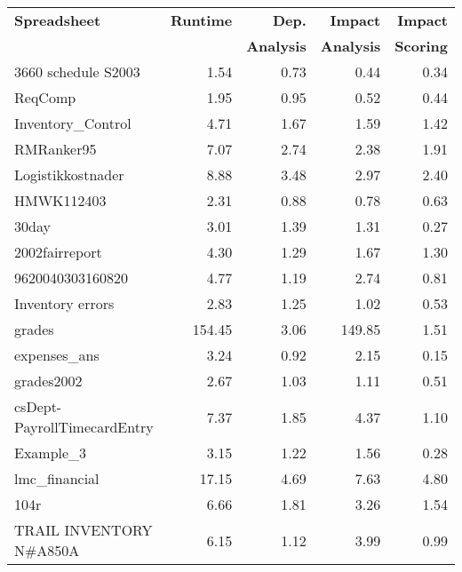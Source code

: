 \begin{table}[!t]
  \centering \begin{tabular}{l|r|rrr} \small{\bf{Spreadsheet}} & \small{\bf{Runtime}} & \small{\bf{Dep.}} & \small{\bf{Impact}}   & \small{\bf{Impact}} \\
    &  & \small{\bf{Analysis}} & \small{\bf{Analysis}} & \small{\bf{Scoring}} \\ \hline
\small{3660 schedule S2003} & \small{1.54} & \small{0.73} & \small{0.44} & \small{0.34} \\ 
\small{ReqComp} & \small{1.95} & \small{0.95} & \small{0.52} & \small{0.44} \\ 
\small{Inventory\_Control} & \small{4.71} & \small{1.67} & \small{1.59} & \small{1.42} \\ 
\small{RMRanker95} & \small{7.07} & \small{2.74} & \small{2.38} & \small{1.91} \\ 
\small{Logistikkostnader} & \small{8.88} & \small{3.48} & \small{2.97} & \small{2.40} \\ 
\small{HMWK112403} & \small{2.31} & \small{0.88} & \small{0.78} & \small{0.63} \\ 
\small{30day} & \small{3.01} & \small{1.39} & \small{1.31} & \small{0.27} \\ 
\small{2002fairreport} & \small{4.30} & \small{1.29} & \small{1.67} & \small{1.30} \\ 
\small{9620040303160820} & \small{4.77} & \small{1.19} & \small{2.74} & \small{0.81} \\ 
\small{Inventory errors} & \small{2.83} & \small{1.25} & \small{1.02} & \small{0.53} \\ 
\small{grades} & \small{154.45} & \small{3.06} & \small{149.85} & \small{1.51} \\ 
\small{expenses\_ans} & \small{3.24} & \small{0.92} & \small{2.15} & \small{0.15} \\ 
\small{grades2002} & \small{2.67} & \small{1.03} & \small{1.11} & \small{0.51} \\ 
\small{csDept-PayrollTimecardEntry} & \small{7.37} & \small{1.85} & \small{4.37} & \small{1.10} \\ 
\small{Example\_3} & \small{3.15} & \small{1.22} & \small{1.56} & \small{0.28} \\ 
\small{lmc\_financial} & \small{17.15} & \small{4.69} & \small{7.63} & \small{4.80} \\ 
\small{104r} & \small{6.66} & \small{1.81} & \small{3.26} & \small{1.54} \\ 
\small{TRAIL INVENTORY N\#A850A} & \small{6.15} & \small{1.12} & \small{3.99} & \small{0.99} \\ 

\end{tabular}
\end{table}
